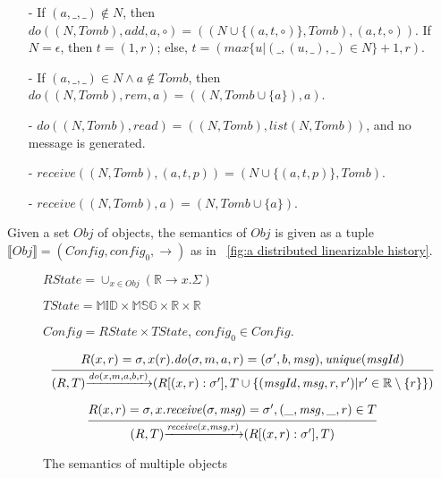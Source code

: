 \begin{example}[RGA]
\begin{itemize}
\item[-] If $(a,\_,\_) \notin N$, then $\mathit{do}((N,\mathit{Tomb}),\mathit{add},a,\circ) = ((N \cup \{ (a,t,\circ) \},\mathit{Tomb}),(a,t,\circ))$. If $N = \epsilon$, then $t = (1,r)$; else, $t = (\mathit{max}\{ u \vert (\_,(u,\_),\_) \in N \}+1,r)$.

\item[-] If $(a,\_,\_) \in N \wedge a \notin \mathit{Tomb}$, then $\mathit{do}((N,\mathit{Tomb}),\mathit{rem},a) = ((N,\mathit{Tomb} \cup \{ a \} ),a)$.

\item[-] $\mathit{do}((N,\mathit{Tomb}),\mathit{read}) = ((N,\mathit{Tomb}),\mathit{list}(N,\mathit{Tomb}))$, and no message is generated.

\item[-] $\mathit{receive}((N,\mathit{Tomb}),(a,t,p)) = (N \cup \{ (a,t,p) \},\mathit{Tomb})$.

\item[-] $\mathit{receive}((N,\mathit{Tomb}),a) = (N,\mathit{Tomb} \cup \{ a \})$.
\end{itemize}
\end{example}

 Given a set $\mathit{Obj}$ of objects, the semantics of $\mathit{Obj}$ is given as a tuple $\llbracket \mathit{Obj} \rrbracket = (\mathit{Config},\mathit{config}_0,\rightarrow)$ as in \figurename~\ref{fig:a distributed linearizable history}.

\begin{figure}[ht]
$\mathit{RState} = \cup_{x \in \mathit{Obj}} (\mathbb{R} \rightarrow x.\Sigma)$

$\mathit{TState} = \mathbb{MID} \times \mathbb{MSG} \times \mathbb{R} \times \mathbb{R}$

$\mathit{Config} = \mathit{RState} \times \mathit{TState}$, $\mathit{config}_0 \in \mathit{Config}$.


\[
\begin{array}{l c}
\bigfrac{ R(x,r) = \sigma, x(r).\mathit{do}(\sigma,m,a,r) = (\sigma',b,\mathit{msg}), \mathit{unique}(\mathit{msgId}) }
{ (R,T) {\xrightarrow{\mathit{do}(x,m,a,b,r)}} (R[(x,r):\sigma'],T \cup \{ (\mathit{msgId},\mathit{msg},r,r') \vert r' \in \mathbb{R} \setminus \{ r \} \}) }
\end{array}
\]

\[
\begin{array}{l c}
\bigfrac{ R(x,r) = \sigma, x.\mathit{receive}(\sigma,\mathit{msg}) = \sigma',(\_,\mathit{msg},\_,r) \in T}
{ (R,T) {\xrightarrow{\mathit{receive}(x,\mathit{msg},r)}} (R[(x,r):\sigma'],T) }
\end{array}
\]
\caption{The semantics of multiple objects}
\label{fig:the semantics of multiple objects}
\end{figure}

